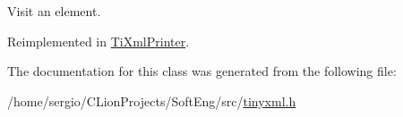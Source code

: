 Visit an element. 



Reimplemented in \hyperlink{class_ti_xml_printer_ae6a1df8271df4bf62d7873c38e34aa69}{Ti\+Xml\+Printer}.



The documentation for this class was generated from the following file\+:\begin{DoxyCompactItemize}
\item 
/home/sergio/\+C\+Lion\+Projects/\+Soft\+Eng/src/\hyperlink{tinyxml_8h}{tinyxml.\+h}\end{DoxyCompactItemize}
